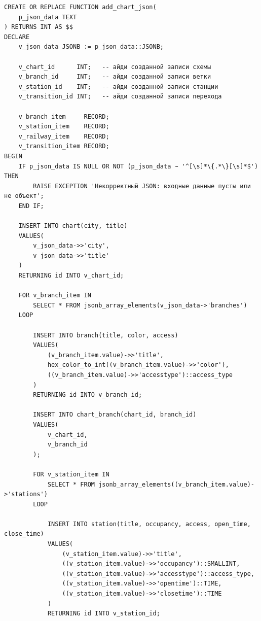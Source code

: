 \begin{lstlisting}[label=lst:add_chart_json:1,caption=Реализация функции добавления схемы (часть 1)]
CREATE OR REPLACE FUNCTION add_chart_json(
    p_json_data TEXT
) RETURNS INT AS $$
DECLARE
    v_json_data JSONB := p_json_data::JSONB;

    v_chart_id      INT;   -- айди созданной записи схемы
    v_branch_id     INT;   -- айди созданной записи ветки
    v_station_id    INT;   -- айди созданной записи станции
    v_transition_id INT;   -- айди созданной записи перехода

    v_branch_item     RECORD;
    v_station_item    RECORD;
    v_railway_item    RECORD;
    v_transition_item RECORD;
BEGIN
    IF p_json_data IS NULL OR NOT (p_json_data ~ '^[\s]*\{.*\}[\s]*$') THEN
        RAISE EXCEPTION 'Некорректный JSON: входные данные пусты или не объект';
    END IF;

    INSERT INTO chart(city, title)
    VALUES(
        v_json_data->>'city',
        v_json_data->>'title'
    )
    RETURNING id INTO v_chart_id;

    FOR v_branch_item IN
        SELECT * FROM jsonb_array_elements(v_json_data->'branches')
    LOOP

        INSERT INTO branch(title, color, access)
        VALUES(
            (v_branch_item.value)->>'title',
            hex_color_to_int((v_branch_item.value)->>'color'),
            ((v_branch_item.value)->>'accesstype')::access_type
        )
        RETURNING id INTO v_branch_id;

        INSERT INTO chart_branch(chart_id, branch_id)
        VALUES(
            v_chart_id,
            v_branch_id
        );

        FOR v_station_item IN
            SELECT * FROM jsonb_array_elements((v_branch_item.value)->'stations')
        LOOP

            INSERT INTO station(title, occupancy, access, open_time, close_time)
            VALUES(
                (v_station_item.value)->>'title',
                ((v_station_item.value)->>'occupancy')::SMALLINT,
                ((v_station_item.value)->>'accesstype')::access_type,
                ((v_station_item.value)->>'opentime')::TIME,
                ((v_station_item.value)->>'closetime')::TIME
            )
            RETURNING id INTO v_station_id;
\end{lstlisting}

\clearpage

